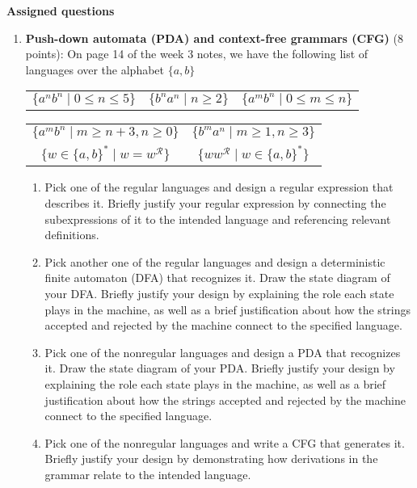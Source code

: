{\bf Assigned questions}
\begin{enumerate}[wide, labelwidth=!, labelindent=0pt]

\item \textbf{Push-down automata (PDA) and context-free grammars (CFG)} (8 points): 
On page 14 of the week 3 notes, we have the following list of languages over the alphabet $\{a,b\}$

\begin{center}
\begin{tabular}{ccc}
    $\{a^nb^n \mid 0  \leq n  \leq 5 \}$
    &$\{b^n a^n \mid  n  \geq 2\}$
    &$\{a^m b^n \mid  0 \leq m\leq n\}$
\end{tabular}
\begin{tabular}{cc}
    $\{a^m b^n \mid  m \geq n+3,  n \geq 0\}$
    &$\{b^m a^n \mid  m \geq 1, n \geq  3\}$\\
    $\{ w  \in \{a,b\}^* \mid w = w^\mathcal{R} \}$
    &$\{ ww^\mathcal{R} \mid w\in \{a,b\}^* \}$ \\
\end{tabular}
\end{center}
\begin{enumerate}
    \item\gradeCompleteFirst Pick one of the regular languages and design a regular expression that describes it. 
    Briefly justify your regular expression by connecting
    the subexpressions of it to the intended language and referencing relevant definitions.
    \item\gradeComplete Pick another one of the regular languages and design a deterministic finite automaton (DFA) that recognizes it. Draw the 
    state diagram of your DFA. Briefly justify your design by explaining the role each state plays in the machine, 
    as well as a brief 
    justification about how the strings accepted and rejected by the machine connect to the specified language.
    \item\gradeComplete Pick one of the nonregular languages and design a PDA that recognizes it. Draw the state diagram of 
    your PDA. Briefly justify your design by explaining the role each state plays in the machine, 
    as well as a brief 
    justification about how the strings accepted and rejected by the machine connect to the specified language.
    \item\gradeComplete Pick one of the nonregular languages and write a CFG that generates it. Briefly justify
    your design by demonstrating how derivations in the grammar relate
    to the intended language.
\end{enumerate}


\end{enumerate}
